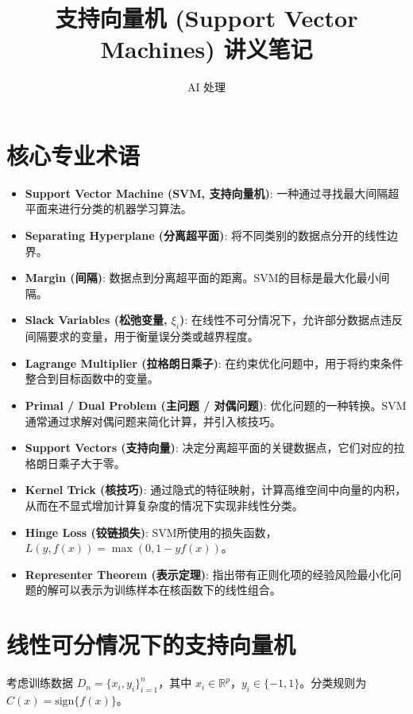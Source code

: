 \documentclass[UTF8]{ctexart}
\title{支持向量机 (Support Vector Machines) 讲义笔记}
\author{AI 处理}
\date{}
\begin{document}
\maketitle

\section{核心专业术语}
\begin{itemize}
    \item \textbf{Support Vector Machine (SVM, 支持向量机)}: 一种通过寻找最大间隔超平面来进行分类的机器学习算法。
    \item \textbf{Separating Hyperplane (分离超平面)}: 将不同类别的数据点分开的线性边界。
    \item \textbf{Margin (间隔)}: 数据点到分离超平面的距离。SVM的目标是最大化最小间隔。
    \item \textbf{Slack Variables (松弛变量, $\xi_i$)}: 在线性不可分情况下，允许部分数据点违反间隔要求的变量，用于衡量误分类或越界程度。
    \item \textbf{Lagrange Multiplier (拉格朗日乘子)}: 在约束优化问题中，用于将约束条件整合到目标函数中的变量。
    \item \textbf{Primal / Dual Problem (主问题 / 对偶问题)}: 优化问题的一种转换。SVM通常通过求解对偶问题来简化计算，并引入核技巧。
    \item \textbf{Support Vectors (支持向量)}: 决定分离超平面的关键数据点，它们对应的拉格朗日乘子大于零。
    \item \textbf{Kernel Trick (核技巧)}: 通过隐式的特征映射，计算高维空间中向量的内积，从而在不显式增加计算复杂度的情况下实现非线性分类。
    \item \textbf{Hinge Loss (铰链损失)}: SVM所使用的损失函数，$L(y, f(x)) = \max(0, 1 - yf(x))$。
    \item \textbf{Representer Theorem (表示定理)}: 指出带有正则化项的经验风险最小化问题的解可以表示为训练样本在核函数下的线性组合。
\end{itemize}

\section{线性可分情况下的支持向量机}
考虑训练数据 $D_n = \{x_i, y_i\}_{i=1}^n$，其中 $x_i \in \mathbb{R}^p$，$y_i \in \{-1, 1\}$。分类规则为 $C(x) = \text{sign}\{f(x)\}$。
\end{document}
